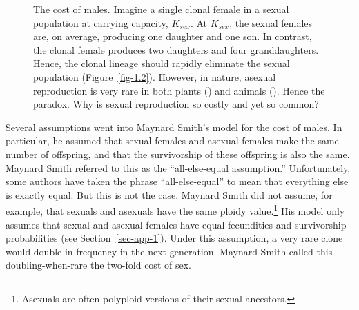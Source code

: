 \documentclass[
  letterpaper,
]{book}
\begin{document}
\begin{figure}


\caption[The cost of males]{\label{fig-1.1}The cost of males. Imagine a
single clonal female in a sexual population at carrying capacity,
\(K_{sex}\). At \(K_{sex}\), the sexual females are, on average,
producing one daughter and one son. In contrast, the clonal female
produces two daughters and four granddaughters. Hence, the clonal
lineage should rapidly eliminate the sexual population
(Figure~\ref{fig-1.2}). However, in nature, asexual reproduction is very
rare in both plants () and animals ().
Hence the paradox. Why is sexual reproduction so costly and yet so
common?}

\end{figure}%

Several assumptions went into Maynard Smith's model for the cost of
males. In particular, he assumed that sexual females and asexual females
make the same number of offspring, and that the survivorship of these
offspring is also the same. Maynard Smith referred to this as the
``all-else-equal assumption.'' Unfortunately, some authors have taken
the phrase ``all-else-equal'' to mean that everything else is exactly
equal. But this is not the case. Maynard Smith did not assume, for
example, that sexuals and asexuals have the same ploidy
value.\footnote{Asexuals are often polyploid versions of their sexual
  ancestors.} His model only assumes that sexual and asexual females
have equal fecundities and survivorship probabilities (see
Section~\ref{sec-app-1}). Under this assumption, a very rare clone would
double in frequency in the next generation. Maynard Smith called this
doubling-when-rare the two-fold cost of sex.
\end{document}
